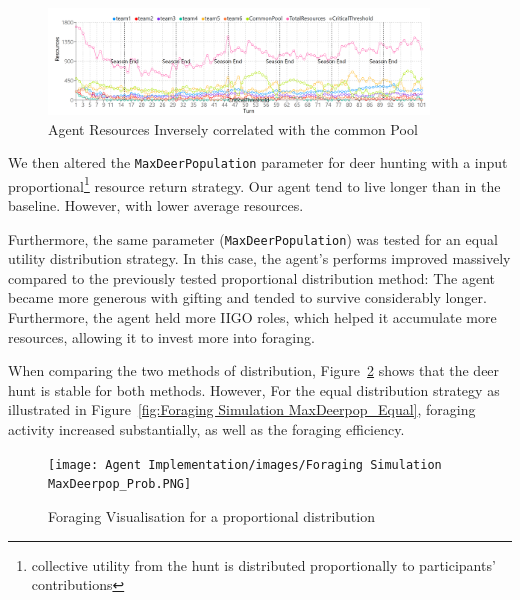 \begin{figure}[!htb]
    \centering
    \includegraphics[width=0.9\textwidth]{13_team5_agentdesign/images/Agent Resources Inveserly correlated.png}
    \caption{Agent Resources Inversely correlated with the common Pool}
    \label{fig:Agent Resources Inversely correlated with the common Pool}
\end{figure}


We then altered the \texttt{MaxDeerPopulation} parameter for deer hunting with a input proportional\footnote{collective utility from the hunt is distributed proportionally to participants' contributions} resource return strategy. Our agent tend to live longer than in the baseline. However, with lower average resources.

Furthermore, the same parameter (\texttt{MaxDeerPopulation}) was tested for an equal utility distribution strategy. In this case, the agent's performs improved massively compared to the previously tested proportional distribution method: The agent became more generous with gifting and tended to survive considerably longer. Furthermore, the agent held more IIGO roles, which helped it accumulate more resources, allowing it to invest more into foraging.

When comparing the two methods of distribution, Figure~\ref{fig:Foraging Simulation MaxDeerpop_Prob} shows that the deer hunt is stable for both methods. However, For the equal distribution strategy as illustrated in Figure~\ref{fig:Foraging Simulation MaxDeerpop_Equal}, foraging activity increased substantially, as well as the foraging efficiency. 

\begin{figure}[!htb]
    \centering
    \texttt{[image: Agent Implementation/images/Foraging Simulation MaxDeerpop\_Prob.PNG]}
    \caption{Foraging Visualisation for a proportional distribution}
    \label{fig:Foraging Simulation MaxDeerpop_Prob}
\end{figure}

